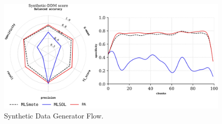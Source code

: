 \begin{figure}[!ht]
	\centering
	\includegraphics[width=1\linewidth]{4_Imbalanced/figures/exp_6.png}
	\caption{Synthetic Data Generator Flow.}
	\label{fig:4_first_proposal_result_exp_6}
\end{figure}


